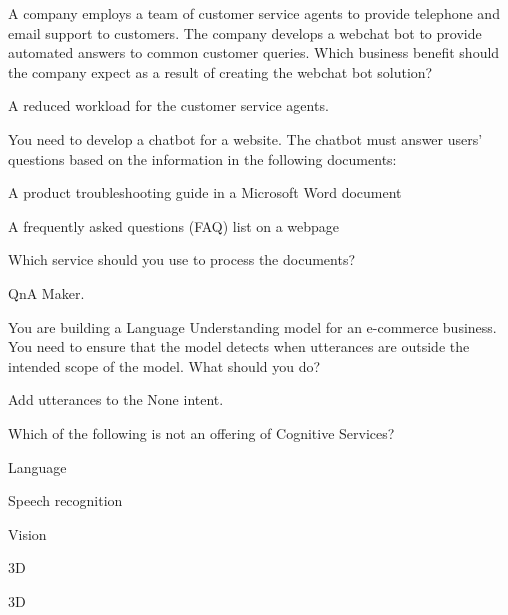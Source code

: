 \begin{qanda}
	\begin{question}
A company employs a team of customer service agents to provide telephone and email support to customers.  The company develops a webchat bot to provide automated answers to common customer queries.  Which business benefit should the company expect as a result of creating the webchat bot solution?
	\end{question}
	\begin{answer}
A reduced workload for the customer service agents.
	\end{answer}
\end{qanda}

\begin{qanda}
	\begin{question}
You need to develop a chatbot for a website. The chatbot must answer users' questions based on the information in the following documents:
\begin{bulletedlist}
	\item A product troubleshooting guide in a Microsoft Word document
	\item A frequently asked questions (FAQ) list on a webpage
\end{bulletedlist}
Which service should you use to process the documents?
	\end{question}
	\begin{answer}
QnA Maker.
	\end{answer}
\end{qanda}

\begin{qanda}
	\begin{question}
You are building a Language Understanding model for an e-commerce business.  You need to ensure that the model detects when utterances are outside the intended scope of the model.  What should you do?
	\end{question}
	\begin{answer}
Add utterances to the None intent.
	\end{answer}
\end{qanda}

\begin{qanda}
	\begin{question}
Which of the following is not an offering of Cognitive Services?
\begin{bulletedlist}
	\item Language
	\item Speech recognition
	\item Vision
	\item 3D
\end{bulletedlist}
	\end{question}
	\begin{answer}
3D
	\end{answer}
\end{qanda}

